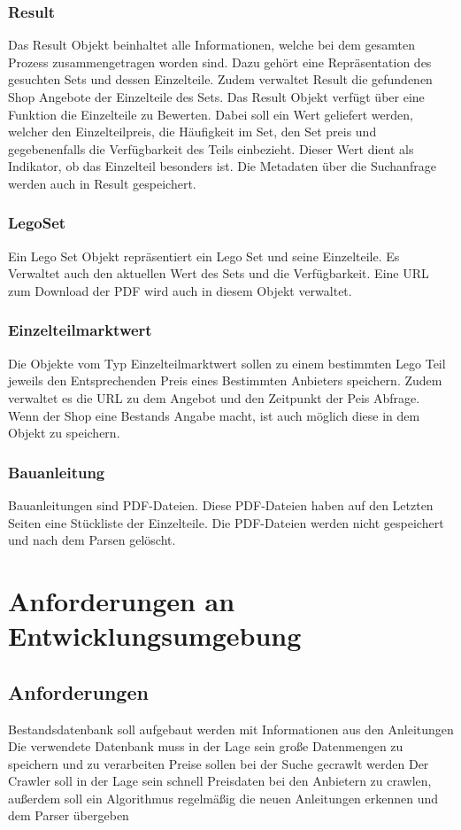\subsubsection{Result}
Das Result Objekt beinhaltet alle Informationen, welche bei dem gesamten Prozess zusammengetragen worden sind. Dazu gehört eine Repräsentation des gesuchten Sets und dessen Einzelteile. Zudem verwaltet Result die gefundenen Shop Angebote der Einzelteile des Sets. Das Result Objekt verfügt über eine Funktion die Einzelteile zu Bewerten. Dabei soll ein Wert geliefert werden, welcher den Einzelteilpreis, die Häufigkeit im Set, den Set preis und gegebenenfalls die Verfügbarkeit des Teils einbezieht. Dieser Wert dient als Indikator, ob das Einzelteil besonders ist. Die Metadaten über die Suchanfrage werden auch in Result gespeichert.

\subsubsection{LegoSet}
Ein Lego Set Objekt repräsentiert ein Lego Set und seine Einzelteile. Es Verwaltet auch den aktuellen Wert des Sets und die Verfügbarkeit. Eine URL zum Download der PDF wird auch in diesem Objekt verwaltet. 

\subsubsection{Einzelteilmarktwert}
Die Objekte vom Typ Einzelteilmarktwert sollen zu einem bestimmten Lego Teil jeweils den Entsprechenden Preis eines Bestimmten Anbieters speichern. Zudem verwaltet es die URL zu dem Angebot und den Zeitpunkt der Peis Abfrage. Wenn der Shop eine Bestands Angabe macht, ist auch möglich diese in dem Objekt zu speichern. 

\subsubsection{Bauanleitung}
Bauanleitungen sind PDF-Dateien. Diese PDF-Dateien haben auf den Letzten Seiten eine Stückliste der Einzelteile. Die PDF-Dateien werden nicht gespeichert und nach dem Parsen gelöscht.
\newpage
\section{Anforderungen an Entwicklungsumgebung}
\subsection{Anforderungen}
Bestandsdatenbank soll aufgebaut werden mit Informationen aus den Anleitungen \newline
Die verwendete Datenbank muss in der Lage sein große Datenmengen zu speichern und zu verarbeiten \newline
Preise sollen bei der Suche gecrawlt werden \newline
Der Crawler soll in der Lage sein schnell Preisdaten bei den Anbietern zu crawlen, außerdem soll ein Algorithmus regelmäßig die neuen Anleitungen erkennen und dem Parser übergeben \newline

